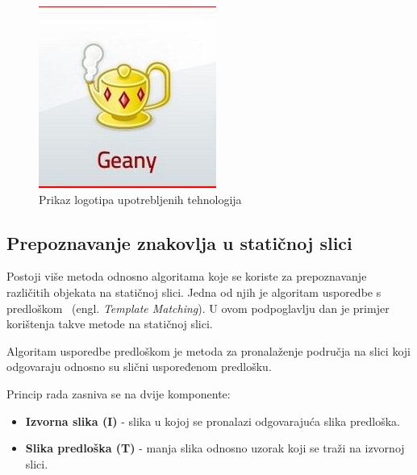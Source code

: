 \begin{figure}[!htb]
\endminipage\hfill
{}%
    \includegraphics[width=\linewidth]{figures/geany.jpg}
\endminipage
\caption{Prikaz logotipa upotrebljenih tehnologija}
\end{figure}


\newpage

\subsection{Prepoznavanje znakovlja u statičnoj slici} %
\label{sub:Algoritam usporedbe predloškom}

Postoji više metoda odnosno algoritama koje se koriste za prepoznavanje
različitih objekata na statičnoj slici. Jedna od njih je algoritam usporedbe s
predloškom~\cite{web:opencv} (engl. \textit{Template Matching}). U ovom
podpoglavlju dan je primjer korištenja takve metode na statičnoj slici. 

Algoritam usporedbe predloškom je metoda za pronalaženje područja na
slici koji odgovaraju odnosno su slični uspoređenom predlošku. 

Princip rada zasniva se na dvije komponente:
\begin{itemize}
    \item \textbf{Izvorna slika (I)} - slika u kojoj se pronalazi
        odgovarajuća slika predloška.
    \item \textbf{Slika predloška (T)} - manja slika odnosno uzorak koji
        se traži na izvornoj slici.
\end{itemize}

